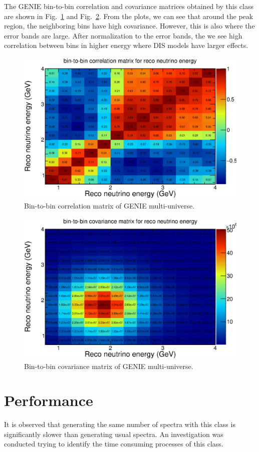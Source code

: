 \documentclass[12pt,a4paper,final]{iopart}
\begin{document}
The GENIE bin-to-bin correlation and covariance matrices obtained by this class are shown in Fig.~\ref{fig:correlation_matrix} and Fig.~\ref{fig:covariance_matrix}. From the plots, we can see that around the peak region, the neighboring bins have high covariance. However, this is also where the error bands are large. After normalization to the error bands, the we see high correlation between bins in higher energy where DIS models have larger effects.

\begin{figure}[h]
  \centering
  \includegraphics[width=.75\textwidth]{figures/correlation_with_counts.eps}
  \caption{Bin-to-bin correlation matrix of GENIE multi-universe.}
  \label{fig:correlation_matrix}
\end{figure}

\begin{figure}[h]
  \centering
  \includegraphics[width=.75\textwidth]{figures/covariance_with_counts.eps}
  \caption{Bin-to-bin covariance matrix of GENIE multi-universe.}
  \label{fig:covariance_matrix}
\end{figure}

\section{Performance}
It is observed that generating the same number of spectra with this class is significantly slower than generating usual spectra. An investigation was conducted trying to identify the time consuming processes of this class.
\end{document}
